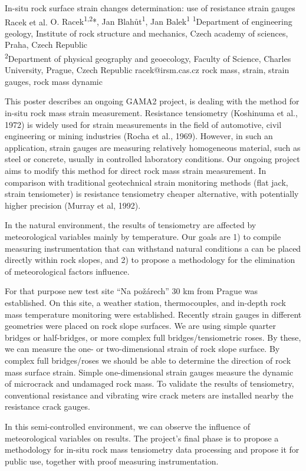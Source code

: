 \abstract
{In-situ rock surface strain changes determination: use of resistance strain gauges} 
{Racek et al.} 
{O. Racek\textsuperscript{1,2}*, Jan Blahůt\textsuperscript{1}, Jan Balek\textsuperscript{1}} 
{\POtag} 
{
\textsuperscript{1}Department of engineering geology, Institute of rock structure and mechanics, Czech academy of sciences, Praha, Czech Republic\\
\textsuperscript{2}Department of physical geography and geoecology, Faculty of Science, Charles University, Prague, Czech Republic
}
{racek@irsm.cas.cz}  %
{rock mass, strain, strain gauges, rock mass dynamic}
{This poster describes an ongoing GAMA2 project, is dealing with the method for in-situ rock mass strain measurement. Resistance tensiometry (Koshinuma et al., 1972) is widely used for strain measurements in the field of automotive, civil engineering or mining industries (Rocha et al., 1969). However, in such an application, strain gauges are measuring relatively homogeneous material, such as steel or concrete, usually in controlled laboratory conditions. Our ongoing project aims to modify this method for direct rock mass strain measurement. In comparison with traditional geotechnical strain monitoring methods (flat jack, strain tensiometer) is resistance tensiometry cheaper alternative, with potentially higher precision (Murray et al, 1992).

In the natural environment, the results of tensiometry are affected by meteorological variables mainly by temperature. Our goals are 1) to compile measuring instrumentation that can withstand natural conditions a can be placed directly within rock slopes, and 2) to propose a methodology for the elimination of meteorological factors influence. 

For that purpose new test site \enquote{Na požárech} 30 km from Prague was established. On this site, a weather station, thermocouples, and in-depth rock mass temperature monitoring were established. Recently strain gauges in different geometries were placed on rock slope surfaces. We are using simple quarter bridges or half-bridges, or more complex full bridges/tensiometric roses. By these, we can measure the one- or two-dimensional strain of rock slope surface. By complex full bridges/roses we should be able to determine the direction of rock mass surface strain. Simple one-dimensional strain gauges measure the dynamic of microcrack and undamaged rock mass. To validate the results of tensiometry, conventional resistance and vibrating wire crack meters are installed nearby the resistance crack gauges. 

In this semi-controlled environment, we can observe the influence of meteorological variables on results. The project’s final phase is to propose a methodology for in-situ rock mass tensiometry data processing and propose it for public use, together with proof measuring instrumentation. 
}
